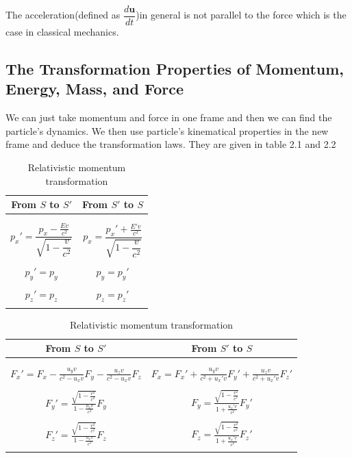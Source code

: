 \documentclass[12pt,a4paper]{article}
\numberwithin{table}{section}
\numberwithin{figure}{section}
\numberwithin{equation}{section}
\theoremstyle{remark}
\theoremstyle{definition}
\begin{document}
The acceleration(defined as $\dfrac{d\textbf{u}}{dt}$)in general is not parallel to the force  which is the case in classical mechanics.
\subsection{The Transformation Properties of Momentum, Energy, Mass, and 
Force}
We can just take momentum and force in one frame and then we can find the particle's dynamics. We then use particle's kinematical properties in the new frame and deduce the transformation laws. They are given in table 2.1 and 2.2
\begin{table}[H]
\begin{center}
\begin{tabular}{||c|c||}
\hline
From $S$ to $S'$ & From $S'$ to $S$\\
\hline
\\ & \\
$p_x'=\dfrac{p_x-\frac{Ev}{c^2}}{\sqrt{1-\dfrac{v}{c^2}}}$ &
$p_x=\dfrac{p_x'+\frac{E'v}{c^2}}{\sqrt{1-\dfrac{v}{c^2}}} $\\ & \\

$p_y'= p_y$ &
$p_y= p_y' $\\ & \\

$p_z'=p_z$ &
$p_z=p_z' $\\ & \\
\hline
\end{tabular}
\caption{Relativistic momentum transformation}
 \label{table:4}
\end{center}
\end{table}
\begin{table}[H]
\begin{center}
\begin{tabular}{||c|c||}
\hline
From $S$ to $S'$ & From $S'$ to $S$\\
\hline
\\ & \\
$F_x'=F_x-\frac{u_yv}{c^2-u_xv}F_y-\frac{u_zv}{c^2-u_xv}F_z$ &
$F_x=F_x'+\frac{u_yv}{c^2+u_x'v}F_y'+\frac{u_zv}{c^2+u_x'v}F_z' $\\ & \\

$F_y'= \frac{\sqrt{1-\frac{v^2}{c^2}}}{1-\frac{u_xv}{c^2}}F_y$ &
$F_y= \frac{\sqrt{1-\frac{v^2}{c^2}}}{1+\frac{u_x'v}{c^2}}F_y' $\\ & \\

$F_z'= \frac{\sqrt{1-\frac{v^2}{c^2}}}{1-\frac{u_xv}{c^2}}F_z$ &
$F_z= \frac{\sqrt{1-\frac{v^2}{c^2}}}{1+\frac{u_x'v}{c^2}}F_z' $\\ & \\
\hline
\end{tabular}
\caption{Relativistic momentum transformation}
 \label{table:4}
\end{center}
\end{table}
\end{document}
